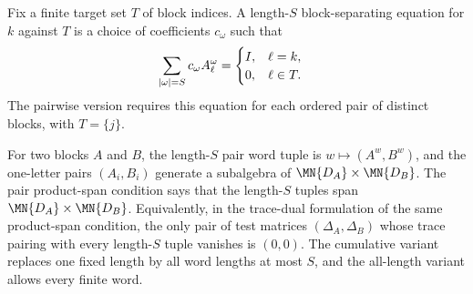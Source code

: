 \begin{definition}
    \label{def:pairwise_block_separating_words}
    \leanok
    Fix a finite target set $T$ of block indices. A length-$S$ block-separating
    equation for $k$ against $T$ is a choice of coefficients $c_\omega$ such
    that
    \begin{align}
        \sum_{|\omega|=S} c_\omega A_\ell^\omega
         & =
        \begin{cases}
            I, & \ell=k,    \\
            0, & \ell\in T.
        \end{cases}
        \notag
    \end{align}
    The pairwise version requires this equation for each ordered pair of
    distinct blocks, with $T=\{j\}$.
\end{definition}

\begin{definition}
    \label{def:pair_trace_separation_words}
    \leanok
    For two blocks $A$ and $B$, the length-$S$ pair word tuple is
    $w\mapsto(A^w,B^w)$, and the one-letter pairs $(A_i,B_i)$ generate a
    subalgebra of $\MN{D_A}\times\MN{D_B}$.
    The pair product-span condition says that the length-$S$ tuples span
    $\MN{D_A}\times\MN{D_B}$. Equivalently, in the trace-dual formulation of
    the same product-span condition, the only pair of test matrices
    $(\Delta_A,\Delta_B)$ whose trace pairing with every length-$S$ tuple
    vanishes is $(0,0)$. The cumulative variant replaces one fixed length by
    all word lengths at most $S$, and the all-length variant allows every
    finite word.
\end{definition}

